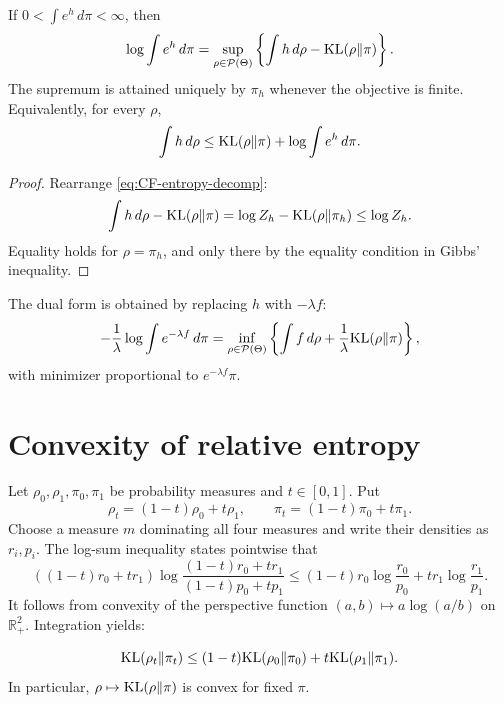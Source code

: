 \begin{theorem}
If $0<\int e^h\,d\pi<\infty$, then
\begin{equation}\label{eq:CF-DV}
 \log\int e^h\,d\pi
 =\sup_{\rho\in\mathcal P(\Theta)}
   \left\{\int h\,d\rho-\mathrm{KL}(\rho\|\pi)\right\}.
\end{equation}
The supremum is attained uniquely by $\pi_h$ whenever the objective is finite.
Equivalently, for every $\rho$,
\begin{equation}\label{eq:CF-change-measure}
 \int h\,d\rho\le\mathrm{KL}(\rho\|\pi)+\log\int e^h\,d\pi.
\end{equation}
\end{theorem}

\begin{proof}
Rearrange \eqref{eq:CF-entropy-decomp}:
\[
 \int h\,d\rho-\mathrm{KL}(\rho\|\pi)
 =\log Z_h-\mathrm{KL}(\rho\|\pi_h)\le\log Z_h.
\]
Equality holds for $\rho=\pi_h$, and only there by the equality condition in Gibbs'
inequality.
\end{proof}

The dual form is obtained by replacing $h$ with $-\lambda f$:
\begin{equation}\label{eq:CF-Gibbs-min}
 -\frac1\lambda\log\int e^{-\lambda f}\,d\pi
 =\inf_{\rho\in\mathcal P(\Theta)}
   \left\{\int f\,d\rho+\frac1\lambda\mathrm{KL}(\rho\|\pi)\right\},
\end{equation}
with minimizer proportional to $e^{-\lambda f}\pi$.

\section{Convexity of relative entropy}
Let $\rho_0,\rho_1,\pi_0,\pi_1$ be probability measures and $t\in[0,1]$.  Put
\[
 \rho_t=(1-t)\rho_0+t\rho_1,
 \qquad
 \pi_t=(1-t)\pi_0+t\pi_1.
\]
Choose a measure $m$ dominating all four measures and write their densities as
$r_i,p_i$.  The log-sum inequality states pointwise that
\begin{equation}\label{eq:CF-logsum}
 ((1-t)r_0+tr_1)
 \log\frac{(1-t)r_0+tr_1}{(1-t)p_0+tp_1}
 \le
 (1-t)r_0\log\frac{r_0}{p_0}+tr_1\log\frac{r_1}{p_1}.
\end{equation}
It follows from convexity of the perspective function
$(a,b)\mapsto a\log(a/b)$ on $\mathbb R_+^2$.  Integration yields:

\begin{theorem}
\begin{equation}\label{eq:CF-joint-convexity}
 \mathrm{KL}(\rho_t\|\pi_t)
 \le(1-t)\mathrm{KL}(\rho_0\|\pi_0)+t\mathrm{KL}(\rho_1\|\pi_1).
\end{equation}
In particular, $\rho\mapsto\mathrm{KL}(\rho\|\pi)$ is convex for fixed $\pi$.
\end{theorem}

